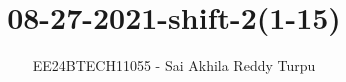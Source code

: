 \documentclass[journal]{IEEEtran}
\begin{document}

\vspace{3cm}

\title{08-27-2021-shift-2(1-15)}
\author{EE24BTECH11055 - Sai Akhila Reddy Turpu}
{\let\newpage\relax\maketitle}



\renewcommand{\thefigure}{\theenumi}
\renewcommand{\thetable}{\theenumi}
\setlength{\intextsep}{10pt} %


\renewcommand{\thetable}{\theenumi}
\end{document}
